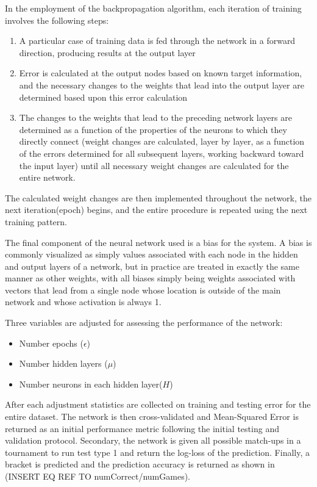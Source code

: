 \documentclass[conference]{IEEEtran}
\begin{document}
In the employment of the backpropagation algorithm, each iteration of training involves the following steps: 
\begin{enumerate}
\item A particular case of training data is fed through the network in a forward direction, producing results at the output layer
\item Error is calculated at the output nodes based on known target information, and the necessary changes to the weights that lead into the output layer are determined based upon this error calculation
\item  The changes to the weights that lead to the preceding network layers are determined as a function of the properties of the neurons to which they directly connect (weight changes are calculated, layer by layer, as a function of the errors determined for all subsequent layers, working backward toward the input layer) until all necessary weight changes are calculated for the entire network. 
\end{enumerate}

The calculated weight changes are then implemented throughout the network, the next iteration(epoch) begins, and the entire procedure is repeated using the next training pattern.

The final component of the neural network used is a bias for the system.
A bias is commonly visualized as simply values associated with each node in the hidden and output layers of a network, but in practice are treated in exactly the same manner as other weights, with all biases simply being weights associated with vectors that lead from a single node whose location is outside of the main network and whose activation is always 1.

Three variables are adjusted for assessing the performance of the network:
\begin{itemize}
\item Number epochs ($\epsilon$)
\item Number hidden layers ($\mu$)
\item Number neurons in each hidden layer($H$)
\end{itemize}

After each adjustment statistics are collected on training and testing error for the entire dataset.
The network is then cross-validated and Mean-Squared Error is returned as an initial performance metric following the initial testing and validation protocol.
Secondary, the network is given all possible match-ups in a tournament to run test type 1 and return the log-loss of the prediction.
Finally, a bracket is predicted and the prediction accuracy is returned as shown in (INSERT EQ REF TO numCorrect/numGames).
\end{document}
